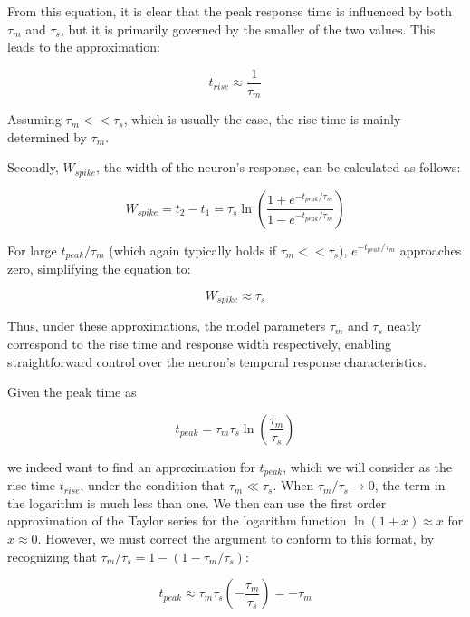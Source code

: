 From this equation, it is clear that the peak response time is influenced by both $\tau_m$ and $\tau_s$, but it is primarily governed by the smaller of the two values. This leads to the approximation:

\begin{equation}
t_{rise} \approx \frac{1}{\tau_m}
\end{equation}

Assuming $\tau_m << \tau_s$, which is usually the case, the rise time is mainly determined by $\tau_m$.

Secondly, $W_{spike}$, the width of the neuron's response, can be calculated as follows:

\begin{equation}
W_{spike} = t_2 - t_1 = \tau_s \ln\left(\frac{1 + e^{-t_{peak}/\tau_m}}{1 - e^{-t_{peak}/\tau_m}}\right)
\end{equation}

For large $t_{peak}/\tau_m$ (which again typically holds if $\tau_m << \tau_s$), $e^{-t_{peak}/\tau_m}$ approaches zero, simplifying the equation to:

\begin{equation}
W_{spike} \approx \tau_s
\end{equation}

Thus, under these approximations, the model parameters $\tau_m$ and $\tau_s$ neatly correspond to the rise time and response width respectively, enabling straightforward control over the neuron's temporal response characteristics.






Given the peak time as

\begin{equation}
t_{peak} = \tau_m \tau_s \ln\left(\frac{\tau_m}{\tau_s}\right)
\end{equation}

we indeed want to find an approximation for $t_{peak}$, which we will consider as the rise time $t_{rise}$, under the condition that $\tau_m \ll \tau_s$. When $\tau_m/\tau_s \rightarrow 0$, the term in the logarithm is much less than one. We then can use the first order approximation of the Taylor series for the logarithm function $\ln(1+x) \approx x$ for $x \approx 0$. However, we must correct the argument to conform to this format, by recognizing that $\tau_m/\tau_s = 1 - (1 - \tau_m/\tau_s)$:

\begin{equation}
t_{peak} \approx \tau_m \tau_s \left(-\frac{\tau_m}{\tau_s}\right) = -\tau_m
\end{equation}

